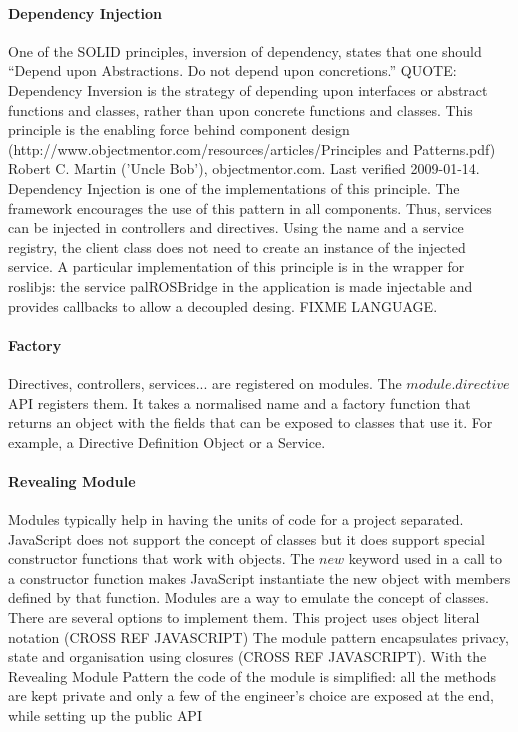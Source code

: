 \paragraph{Dependency Injection} One of the \ac{SOLID} principles, inversion of dependency, states that one should “Depend upon Abstractions. Do not depend upon concretions.”
QUOTE: Dependency Inversion is the strategy of depending upon interfaces or abstract functions and classes, rather than upon concrete functions and classes. This principle is the enabling force behind component design (http://www.objectmentor.com/resources/articles/Principles and Patterns.pdf) Robert C. Martin ('Uncle Bob'), objectmentor.com. Last verified 2009-01-14.
Dependency Injection is one of the implementations of this principle.
The framework encourages the use of this pattern in all components. 
Thus, services can be injected in controllers and directives.
Using the name and a service registry, the client class does not need to create an instance of the injected service. 
A particular implementation of this principle is in the wrapper for roslibjs: the service palROSBridge in the application is made injectable and provides callbacks to allow a decoupled desing. FIXME LANGUAGE.

\paragraph{Factory} Directives, controllers, services... are registered on modules. 
The $module.directive$ \ac{API} registers them. 
It takes a normalised name and a factory function that returns an object with the fields that can be exposed to classes that use it.
For example, a Directive Definition Object or a Service.

\paragraph{Revealing Module} \cite{Osmani:2012} Modules typically help in having the units of code for a project separated.
JavaScript does not support the concept of classes but it does support special constructor functions that work with objects. 
The $new$ keyword used in a call to a constructor function makes JavaScript instantiate the new object with members defined by that function.
Modules are a way to emulate the concept of classes.
There are several options to implement them. 
This project uses object literal notation (CROSS REF JAVASCRIPT)
The module pattern encapsulates privacy, state and organisation using closures (CROSS REF JAVASCRIPT).
With the Revealing Module Pattern the code of the module is simplified: all the methods are kept private and only a few of the engineer's choice are exposed at the end, while setting up the public \ac{API}

